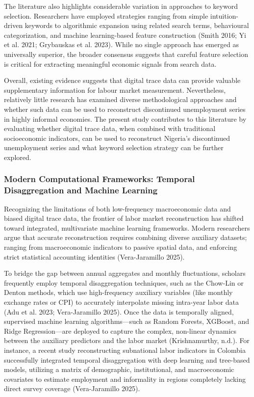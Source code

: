 \documentclass[
  letterpaper,
  DIV=11,
  numbers=noendperiod]{scrartcl}
\begin{document}
The literature also highlights considerable variation in approaches to
keyword selection. Researchers have employed strategies ranging from
simple intuition-driven keywords to algorithmic expansion using related
search terms, behavioural categorization, and machine learning-based
feature construction (Smith 2016; Yi et al. 2021; Grybauskas et al.
2023). While no single approach has emerged as universally superior, the
broader consensus suggests that careful feature selection is critical
for extracting meaningful economic signals from search data.

Overall, existing evidence suggests that digital trace data can provide
valuable supplementary information for labour market measurement.
Nevertheless, relatively little research has examined diverse
methodological approaches and whether such data can be used to
reconstruct discontinued unemployment series in highly informal
economies. The present study contributes to this literature by
evaluating whether digital trace data, when combined with traditional
socioeconomic indicators, can be used to reconstruct Nigeria's
discontinued unemployment series and what keyword selection strategy can
be further explored.

\subsubsection{Modern Computational Frameworks: Temporal Disaggregation
and Machine
Learning}\label{modern-computational-frameworks-temporal-disaggregation-and-machine-learning}

Recognizing the limitations of both low-frequency macroeconomic data and
biased digital trace data, the frontier of labor market reconstruction
has shifted toward integrated, multivariate machine learning frameworks.
Modern researchers argue that accurate reconstruction requires combining
diverse auxiliary datasets; ranging from macroeconomic indicators to
passive spatial data, and enforcing strict statistical accounting
identities (Vera-Jaramillo 2025).

To bridge the gap between annual aggregates and monthly fluctuations,
scholars frequently employ temporal disaggregation techniques, such as
the Chow-Lin or Denton methods, which use high-frequency auxiliary
variables (like monthly exchange rates or CPI) to accurately interpolate
missing intra-year labor data (Adu et al. 2023; Vera-Jaramillo 2025).
Once the data is temporally aligned, supervised machine learning
algorithms---such as Random Forests, XGBoost, and Ridge Regression---are
deployed to capture the complex, non-linear dynamics between the
auxiliary predictors and the labor market (Krishnamurthy, n.d.). For
instance, a recent study reconstructing subnational labor indicators in
Colombia successfully integrated temporal disaggregation with deep
learning and tree-based models, utilizing a matrix of demographic,
institutional, and macroeconomic covariates to estimate employment and
informality in regions completely lacking direct survey coverage
(Vera-Jaramillo 2025).
\end{document}
